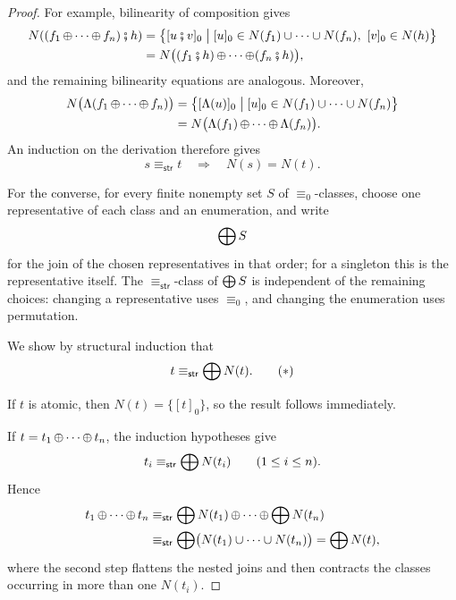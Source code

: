 \begin{proof}
For example, bilinearity of composition gives
\begin{align*}
  N((f_1\operatorname{\oplus}\cdots\operatorname{\oplus} f_n)\fatsemi h)
  &=
  \bigl\{
    [u\fatsemi v]_0
    \mathrel{\big|}
    [u]_0\in N(f_1)\cup\cdots\cup N(f_n),\
    [v]_0\in N(h)
  \bigr\}\\
  &=
  N\bigl((f_1\fatsemi h)\operatorname{\oplus}\cdots\operatorname{\oplus}(f_n\fatsemi h)\bigr),
\end{align*}
and the remaining bilinearity equations are analogous. Moreover,
\begin{align*}
  N\bigl(\Lambda(f_1\operatorname{\oplus}\cdots\operatorname{\oplus} f_n)\bigr)
  &=
  \bigl\{
    [\Lambda(u)]_0
    \mathrel{\big|}
    [u]_0\in N(f_1)\cup\cdots\cup N(f_n)
  \bigr\}\\
  &=
  N\bigl(\Lambda(f_1)\operatorname{\oplus}\cdots\operatorname{\oplus}\Lambda(f_n)\bigr).
\end{align*}
An induction on the derivation therefore gives
\[
  s\equiv_{\mathsf{str}}t
  \quad\Longrightarrow\quad
  N(s)=N(t).
\]

For the converse, for every finite nonempty set \(S\) of
\(\equiv_0\)-classes, choose one representative of each class and an
enumeration, and write
\[
  \operatorname{\bigoplus} S
\]
for the join of the chosen representatives in that order; for a
singleton this is the representative itself.  
The
\(\equiv_{\mathsf{str}}\)-class of \(\operatorname{\bigoplus} S\) is independent of the
remaining choices: changing a representative uses \(\equiv_0\), and
changing the enumeration uses permutation.

We show by structural induction that
\begin{equation}
  t\equiv_{\mathsf{str}}\operatorname{\bigoplus} N(t).
  \tag{$\ast$}
  \label{eq:lambda-term-normal-forms-2}
\end{equation}

If \(t\) is atomic, then \(N(t)=\{[t]_0\}\), so the result follows
immediately.

If \(t=t_1\operatorname{\oplus}\cdots\operatorname{\oplus} t_n\), the induction hypotheses give
\[
  t_i\equiv_{\mathsf{str}}\operatorname{\bigoplus} N(t_i)
  \qquad(1\leq i\leq n).
\]
Hence
\[
\begin{aligned}
  t_1\operatorname{\oplus}\cdots\operatorname{\oplus} t_n
  &\equiv_{\mathsf{str}}
  \operatorname{\bigoplus} N(t_1)\operatorname{\oplus}\cdots\operatorname{\oplus}\operatorname{\bigoplus} N(t_n)\\
  &\equiv_{\mathsf{str}}
  \operatorname{\bigoplus}\bigl(N(t_1)\cup\cdots\cup N(t_n)\bigr)
  =
  \operatorname{\bigoplus} N(t),
\end{aligned}
\]
where the second step flattens the nested joins and then contracts the
classes occurring in more than one \(N(t_i)\).


\end{proof}
